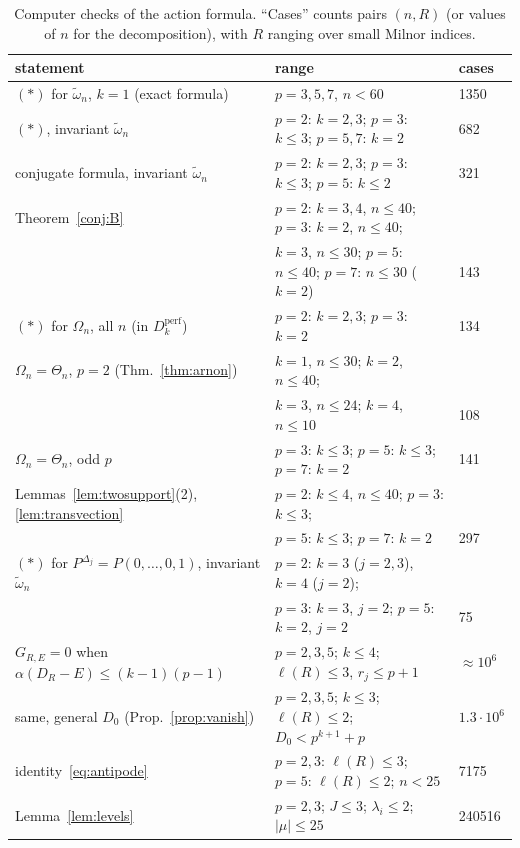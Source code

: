 \documentclass[11pt]{amsart}
\theoremstyle{definition}
\theoremstyle{remark}
\newcommand{\Dperf}{D_k^{\mathrm{perf}}}
\newcommand{\wt}{\widetilde{\omega}}
\begin{document}
\begin{table}[h]
\centering\small
\begin{tabular}{@{}lll@{}}
\toprule
statement & range & cases\\
\midrule
$(\ast)$ for $\wt_n$, $k=1$ (exact formula) & $p=3,5,7$, $n<60$ & 1350\\
$(\ast)$, invariant $\wt_n$ & $p=2$: $k=2,3$; $p=3$: $k\le3$; $p=5,7$: $k=2$ & 682\\
conjugate formula, invariant $\wt_n$ & $p=2$: $k=2,3$; $p=3$: $k\le3$; $p=5$: $k\le2$ & 321\\
Theorem~\ref{conj:B} & $p=2$: $k=3,4$, $n\le40$; $p=3$: $k=2$, $n\le 40$; & \\
  & \quad $k=3$, $n\le30$; $p=5$: $n\le40$; $p=7$: $n\le30$ ($k=2$) & 143\\
$(\ast)$ for $\Omega_n$, all $n$ (in $\Dperf$) & $p=2$: $k=2,3$; $p=3$: $k=2$ & 134\\
$\Omega_n=\Theta_n$, $p=2$ (Thm.~\ref{thm:arnon}) & $k=1$, $n\le30$; $k=2$, $n\le40$; & \\
  & \quad $k=3$, $n\le24$; $k=4$, $n\le10$ & 108\\
$\Omega_n=\Theta_n$, odd $p$ & $p=3$: $k\le3$; $p=5$: $k\le3$; $p=7$: $k=2$ & 141\\
Lemmas~\ref{lem:twosupport}(2), \ref{lem:transvection} & $p=2$: $k\le4$, $n\le40$; $p=3$: $k\le3$; & \\
  & \quad $p=5$: $k\le3$; $p=7$: $k=2$ & 297\\
$(\ast)$ for $P^{\Delta_j}=P(0,\dots,0,1)$, invariant $\wt_n$ & $p=2$: $k=3$ ($j=2,3$), $k=4$ ($j=2$); & \\
  & \quad $p=3$: $k=3$, $j=2$; $p=5$: $k=2$, $j=2$ & 75\\
$G_{R,E}=0$ when $\alpha(D_R-E)\le(k-1)(p-1)$ & $p=2,3,5$; $k\le4$; $\ell(R)\le3$, $r_j\le p+1$ & $\approx10^6$\\
same, general $D_0$ (Prop.~\ref{prop:vanish}) & $p=2,3,5$; $k\le3$; $\ell(R)\le2$; $D_0<p^{k+1}+p$ & $1.3\cdot10^6$\\
identity~\eqref{eq:antipode} & $p=2,3$: $\ell(R)\le3$; $p=5$: $\ell(R)\le2$; $n<25$ & 7175\\
Lemma~\ref{lem:levels} & $p=2,3$; $J\le3$; $\lambda_i\le2$; $|\mu|\le25$ & 240516\\
\bottomrule
\end{tabular}
\caption{Computer checks of the action formula.  ``Cases'' counts pairs
$(n,R)$ (or values of $n$ for the decomposition), with $R$ ranging over small
Milnor indices.}\label{tab:checks}
\end{table}
\end{document}
